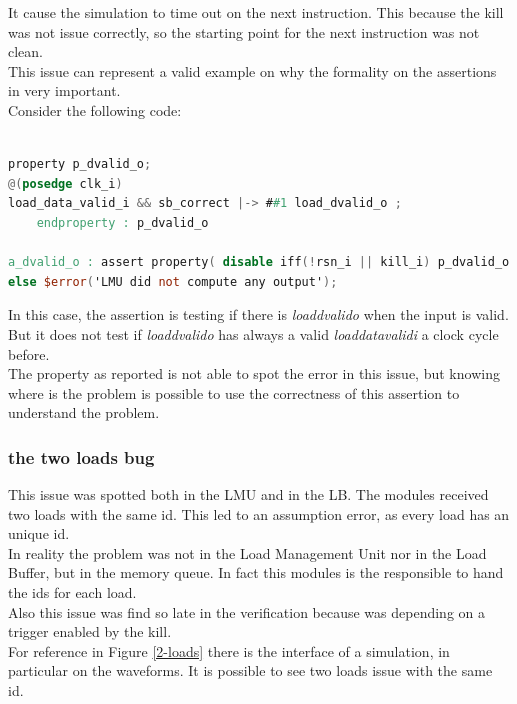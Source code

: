 It cause the simulation to time out on the next instruction. This because the kill was not issue correctly, so the starting point for the next instruction was not clean. \\

This issue can represent a valid example on why the formality on the assertions in very important.\\
Consider the following code:\\

\begin{lstlisting}[language=Verilog,style=verilog-style, backgroundcolor=\color{lyel_palette}, frame=tlb]

property p_dvalid_o;
@(posedge clk_i)
load_data_valid_i && sb_correct |-> ##1 load_dvalid_o ;
	endproperty : p_dvalid_o

a_dvalid_o : assert property( disable iff(!rsn_i || kill_i) p_dvalid_o )
else $error('LMU did not compute any output');
\end{lstlisting}


In this case, the assertion is testing if there is \emph{load\+dvalid\+o} when the input is valid. But it does not test if \emph{load\+dvalid\+o} has always a valid \emph{load\+data\+valid\+i} a clock cycle before.\\

The property as reported is not able to spot the error in this issue, but knowing where is the problem is possible to use the correctness of this assertion to understand the problem.\\

\subsubsection{the two loads bug}
This issue was spotted both in the LMU and in the LB. The modules received two loads with the same id. This led to an assumption error, as every load has an unique id.\\

In reality the problem was not in the Load Management Unit nor in the Load Buffer, but in the memory queue. In fact this modules is the responsible to hand the ids for each load.\\

Also this issue was find so late in the verification because was depending on a trigger enabled by the kill.\\

For reference in Figure \ref{2-loads} there is the interface of a simulation, in particular on the waveforms. It is possible to see two loads issue with the same id.\\

